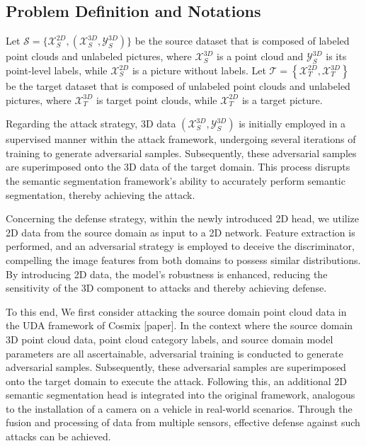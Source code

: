 \documentclass[conference]{IEEEtran}
\begin{document}
\subsection{Problem Definition and Notations}\label{AA}
Let ${\mathcal{S}=\{\mathcal{X}_S^{2D}, (\mathcal{X}_S^{3D}, \mathcal{Y}_S^{3D})\}}$ be the source dataset that is composed of labeled point clouds and unlabeled pictures, where $\mathcal{X}_S^{3D}$ is a point cloud and $\mathcal{Y}_S^{3D}$ is its point-level labels, while $\mathcal{X}_S^{2D}$ is a picture without labels. Let $\mathcal{T}=\left\{\mathcal{X}_T^{2D}, \mathcal{X}_T^{3D}\right\}$ be the target dataset that is composed of unlabeled point clouds and unlabeled pictures, where $\mathcal{X}_T^{3D}$ is target point clouds, while $\mathcal{X}_T^{2D}$ is a target picture.

Regarding the attack strategy, 3D data $(\mathcal{X}_S^{3D}, \mathcal{Y}_S^{3D})$ is initially employed in a supervised manner within the attack framework, undergoing several iterations of training to generate adversarial samples. Subsequently, these adversarial samples are superimposed onto the 3D data of the target domain. This process disrupts the semantic segmentation framework's ability to accurately perform semantic segmentation, thereby achieving the attack.

Concerning the defense strategy, within the newly introduced 2D head, we utilize 2D data from the source domain as input to a 2D network. Feature extraction is performed, and an adversarial strategy is employed to deceive the discriminator, compelling the image features from both domains to possess similar distributions. By introducing 2D data, the model's robustness is enhanced, reducing the sensitivity of the 3D component to attacks and thereby achieving defense.

To this end, We first consider attacking the source domain point cloud data in the UDA framework of Cosmix [paper]. In the context where the source domain 3D point cloud data, point cloud category labels, and source domain model parameters are all ascertainable, adversarial training is conducted to generate adversarial samples. Subsequently, these adversarial samples are superimposed onto the target domain to execute the attack. Following this, an additional 2D semantic segmentation head is integrated into the original framework, analogous to the installation of a camera on a vehicle in real-world scenarios. Through the fusion and processing of data from multiple sensors, effective defense against such attacks can be achieved.
\end{document}
